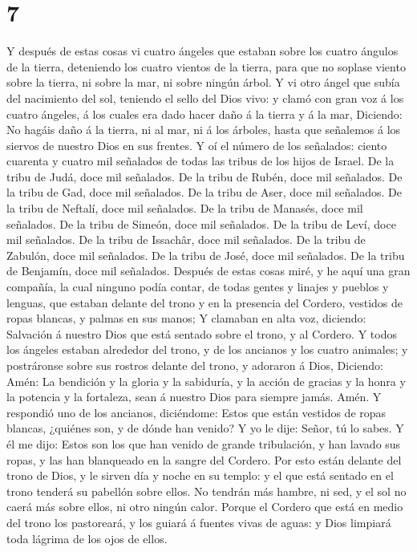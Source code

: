 \hypertarget{section-6}{%
\section{7}\label{section-6}}

 Y después de estas cosas vi cuatro ángeles que estaban
sobre los cuatro ángulos de la tierra, deteniendo los cuatro vientos de
la tierra, para que no soplase viento sobre la tierra, ni sobre la mar,
ni sobre ningún árbol.  Y vi otro ángel que subía del
nacimiento del sol, teniendo el sello del Dios vivo: y clamó con gran
voz á los cuatro ángeles, á los cuales era dado hacer daño á la tierra y
á la mar,  Diciendo: No hagáis daño á la tierra, ni al
mar, ni á los árboles, hasta que señalemos á los siervos de nuestro Dios
en sus frentes.  Y oí el número de los señalados: ciento
cuarenta y cuatro mil señalados de todas las tribus de los hijos de
Israel.  De la tribu de Judá, doce mil señalados. De la
tribu de Rubén, doce mil señalados. De la tribu de Gad, doce mil
señalados.  De la tribu de Aser, doce mil señalados. De la
tribu de Neftalí, doce mil señalados. De la tribu de Manasés, doce mil
señalados.  De la tribu de Simeón, doce mil señalados. De
la tribu de Leví, doce mil señalados. De la tribu de Issachâr, doce mil
señalados.  De la tribu de Zabulón, doce mil señalados. De
la tribu de José, doce mil señalados. De la tribu de Benjamín, doce mil
señalados.  Después de estas cosas miré, y he aquí una
gran compañía, la cual ninguno podía contar, de todas gentes y linajes y
pueblos y lenguas, que estaban delante del trono y en la presencia del
Cordero, vestidos de ropas blancas, y palmas en sus manos;
 Y clamaban en alta voz, diciendo: Salvación á nuestro
Dios que está sentado sobre el trono, y al Cordero.  Y
todos los ángeles estaban alrededor del trono, y de los ancianos y los
cuatro animales; y postráronse sobre sus rostros delante del trono, y
adoraron á Dios,  Diciendo: Amén: La bendición y la
gloria y la sabiduría, y la acción de gracias y la honra y la potencia y
la fortaleza, sean á nuestro Dios para siempre jamás. Amén.
 Y respondió uno de los ancianos, diciéndome: Estos que
están vestidos de ropas blancas, ¿quiénes son, y de dónde han venido?
 Y yo le dije: Señor, tú lo sabes. Y él me dijo: Estos
son los que han venido de grande tribulación, y han lavado sus ropas, y
las han blanqueado en la sangre del Cordero.  Por esto
están delante del trono de Dios, y le sirven día y noche en su templo: y
el que está sentado en el trono tenderá su pabellón sobre ellos.
 No tendrán más hambre, ni sed, y el sol no caerá más
sobre ellos, ni otro ningún calor.  Porque el Cordero que
está en medio del trono los pastoreará, y los guiará á fuentes vivas de
aguas: y Dios limpiará toda lágrima de los ojos de ellos.

